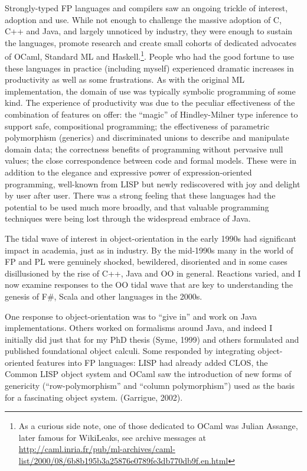 \documentclass[acmsmall]{acmart}\settopmatter{}
\begin{document}
Strongly-typed FP languages and compilers saw an ongoing trickle of interest, adoption and use. While not enough to challenge the massive adoption of C, C++ and Java,
and largely unnoticed by industry, they were enough to sustain the languages, promote research and create small cohorts of dedicated advocates of OCaml, Standard ML
and Haskell.\footnote{As a curious side note, one of those dedicated to OCaml was Julian Assange, later famous for WikiLeaks, see archive messages
at \url{http://caml.inria.fr/pub/ml-archives/caml-list/2000/08/6b8b195b3a25876e0789fe3db770db9f.en.html}}.   People who had the good fortune to use these languages
in practice (including myself) experienced dramatic increases in productivity as well as some frustrations. As with the original ML implementation, the domain of use was
typically symbolic programming of some kind. The experience of productivity was due to the peculiar effectiveness of the combination of features on offer: the “magic”
of Hindley-Milner type inference to support safe, compositional programming; the effectiveness of parametric polymorphism (generics) and discriminated unions to describe
and manipulate domain data; the correctness benefits of programming without pervasive null values; the close correspondence between code and formal models. These were
in addition to the elegance and expressive power of expression-oriented programming, well-known from LISP but newly rediscovered with joy and delight by user after
user. There was a strong feeling that these languages had the potential to be used much more broadly, and that valuable programming techniques were being lost through
the widespread embrace of Java.  

The tidal wave of interest in object-orientation in the early 1990s had significant impact in academia, just as in industry.  By the mid-1990s many in the world of FP and PL
were genuinely shocked, bewildered, disoriented and in some cases disillusioned by the rise of C++, Java and OO in general.  Reactions varied, and I now examine responses to
the OO tidal wave that are key to understanding the genesis of F\#, Scala and other languages in the 2000s. 

One response to object-orientation was to “give in” and work on Java implementations. Others worked on formalisms around Java, and indeed I initially
did just that for my PhD thesis (Syme, 1999) and others formulated and published foundational object calculi. Some responded by integrating object-oriented
features into FP languages: LISP had already added CLOS, the Common LISP object system and OCaml saw the introduction of new forms of
genericity (“row-polymorphism” and “column polymorphism”) used as the basis for a fascinating object system. (Garrigue, 2002).
\end{document}
